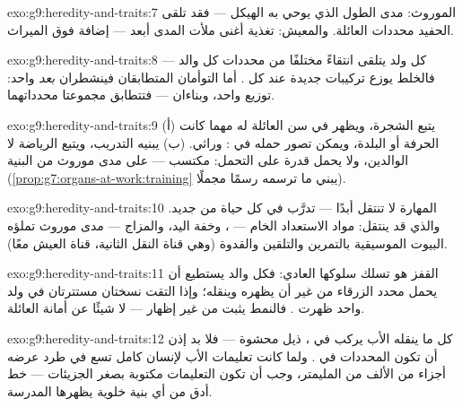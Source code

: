 \begin{solution}{exo:g9:heredity-and-traits:7}
الموروث: مدى الطول الذي يوحي به الهيكل --- فقد تلقى
الحفيد محددات العائلة. والمعيش: تغذية أغنى ملأت المدى
أبعد --- إضافة  فوق الميراث.
\end{solution}

\begin{solution}{exo:g9:heredity-and-traits:8}
كل ولد يتلقى انتقاءً مختلفًا من محددات كل والد ---
فالخلط يوزع تركيبات جديدة عند كل . أما التوأمان
المتطابقان فينشطران \emph{بعد}  واحد: توزيع واحد،
وبناءان --- فتتطابق مجموعتا محدداتهما.
\end{solution}

\begin{solution}{exo:g9:heredity-and-traits:9}
(أ) يتبع الشجرة، ويظهر في سن العائلة له مهما كانت
الحرفة أو البلدة، ويمكن تصور حمله في : وراثي. (ب)
يبنيه التدريب، ويتبع الرياضة لا الوالدين، ولا  يحمل
قدرة على التحمل: مكتسب --- على مدى موروث من البنية
 (\cref{prop:g7:organs-at-work:training} يبني ما
ترسمه  رسمًا مجملًا).
\end{solution}

\begin{solution}{exo:g9:heredity-and-traits:10}
المهارة لا تنتقل أبدًا ---  تدرَّب في كل حياة من
جديد. والذي قد ينتقل: مواد الاستعداد الخام --- ،
وخفة اليد، والمزاج --- مدى موروث تملؤه البيوت الموسيقية
بالتمرين والتلقين والقدوة (وهي قناة النقل الثانية، قناة
العيش معًا).
\end{solution}

\begin{solution}{exo:g9:heredity-and-traits:11}
القفز هو  تسلك سلوكها العادي: فكل والد يستطيع أن
يحمل محدد  الزرقاء من غير أن يظهره وينقله؛ وإذا
التقت نسختان مستترتان في ولد واحد ظهرت . فالنمط
يثبت  من غير إظهار --- لا شيئًا عن أمانة العائلة.
\end{solution}

\begin{solution}{exo:g9:heredity-and-traits:12}
كل ما ينقله الأب يركب في ،  ذيل 
محشوة --- فلا بد إذن أن تكون المحددات في . ولما
كانت تعليمات الأب لإنسان كامل تسع في طرد عرضه أجزاء من
الألف من المليمتر، وجب أن تكون التعليمات مكتوبة بصغر
الجزيئات --- خط أدق من أي بنية خلوية يظهرها 
المدرسة.
\end{solution}


